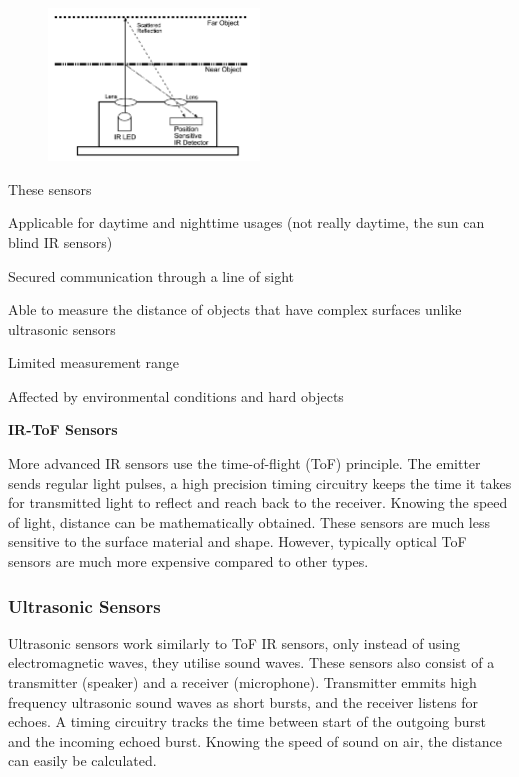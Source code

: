\documentclass[12pt, a4paper]{article}
\begin{document}
                    \begin{figure}[H]\centering
                        \includegraphics[width=0.5\textwidth]{triangulation}
                    \end{figure}

                    These sensors 

                    Applicable for daytime and nighttime usages (not really daytime, the sun can blind IR  sensors)

                    Secured communication through a line of sight

                    Able to measure the distance of objects that have complex surfaces unlike ultrasonic sensors

                    Limited measurement range

                    Affected by environmental conditions and hard objects
                
                \bigskip\noindent
                \textbf{IR-ToF Sensors}

                    More advanced IR sensors use the time-of-flight (ToF) principle. The emitter sends regular light pulses, a high precision timing circuitry keeps the time it takes for transmitted light to reflect and reach back to the receiver. Knowing the speed of light, distance can be mathematically obtained. These sensors are much less sensitive to the surface material and shape. However, typically optical ToF sensors are much more expensive compared to other types.

                    
            
            \subsubsection{Ultrasonic Sensors}
                Ultrasonic sensors work similarly to ToF IR sensors, only instead of using electromagnetic waves, they utilise sound waves. These sensors also consist of a transmitter (speaker) and a receiver (microphone). Transmitter emmits high frequency ultrasonic sound waves as short bursts, and the receiver listens for echoes. A timing circuitry tracks the time between start of the outgoing burst and the incoming echoed burst. Knowing the speed of sound on air, the distance can easily be calculated.
\end{document}
